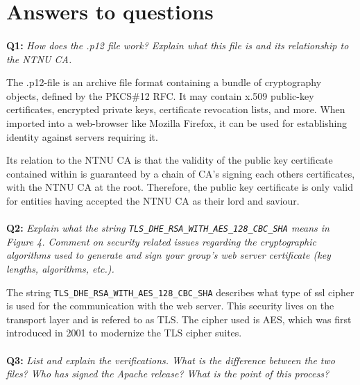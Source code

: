 \section{Answers to questions}

\paragraph{}
\textbf{Q1:}
\textit{How does the .p12 file work? Explain what this file is and its relationship to the NTNU CA.}

The .p12-file is an archive file format containing a bundle of cryptography objects, defined by the PKCS\#12 RFC\cite{pkcs-12}.
It may contain x.509 public-key certificates\cite{x509}, encrypted private keys, certificate revocation lists, and more.
When imported into a web-browser like Mozilla Firefox, it can be used for establishing identity against servers requiring it.

Its relation to the NTNU CA is that the validity of the public key certificate contained within is guaranteed by a chain of CA's signing each others certificates, with the NTNU CA at the root.
Therefore, the public key certificate is only valid for entities having accepted the NTNU CA as their lord and saviour.

\paragraph{}
\textbf{Q2:}
\cprotect\textit{Explain what the string \verb/TLS_DHE_RSA_WITH_AES_128_CBC_SHA/ means in Figure 4. Comment on security related issues regarding the cryptographic algorithms used to generate and sign your group's web server certificate (key lengths, algorithms, etc.).}

The string \verb/TLS_DHE_RSA_WITH_AES_128_CBC_SHA/ describes what type of ssl cipher is used for the communication with the web server.
This security lives on the transport layer and is refered to as TLS.
The cipher used is AES, which was first introduced in 2001\cite{rfc3268} to modernize the TLS cipher suites.



\paragraph{}
\textbf{Q3:}
\textit{List and explain the verifications. What is the difference between the two files? Who has signed the Apache release? What is the point of this process?}

